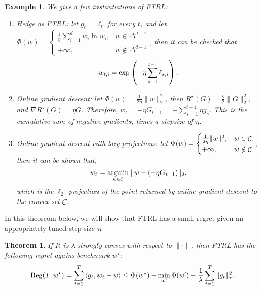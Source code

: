 \documentclass{article}
\newtheorem{example}{Example}
\newtheorem{theorem}{Theorem}
\DeclareMathOperator*{\Reg}{{\rm Reg}}
\DeclareMathOperator*{\Ccal}{{\cal C}}
\DeclareMathOperator*{\argmin}{{\rm argmin}}
\newcommand{\inner}[2]{\left\langle #1,#2 \right\rangle}
\begin{document}
\begin{example}
We give a few instantiations of FTRL:
\begin{enumerate}
\item Hedge as FTRL: let $g_t = \ell_t$ for every $t$, and let $\Phi(w) = \begin{cases} \frac1\eta \sum_{i=1}^d w_i \ln w_i, & w \in \Delta^{d-1} \\
 +\infty, & w \notin \Delta^{d-1} \end{cases}$, then it can be checked that
 \[ w_{t,i} = \exp\del{-\eta \sum_{s=1}^{t-1} \ell_{s,i}}. \]

\item Online gradient descent: let $\Phi(w) = \frac{1}{2\eta}\| w \|_2^2$, then $R^\star(G) = \frac{\eta}{2} \| G \|_2^2$, and $\nabla R^\star(G) = \eta G$.
Therefore, $w_t = -\eta G_{t-1} = - \sum_{s=1}^{t-1} \eta g_s$. This is the cumulative sum of negative gradients, times a stepsize of $\eta$.

\item Online gradient descent with lazy projections: let $\Phi(w) = \begin{cases} \frac{1}{2\eta}\| w \|^2,& w \in \Ccal, \\ +\infty, & w \notin \Ccal \end{cases}$, then it can be shown that,
\[ w_t = \argmin_{w \in \Ccal} \| w - (-\eta G_{t-1}) \|_2, \]
which is the $\ell_2$-projection of the point returned by online gradient descent to the convex set $\Ccal$.
\end{enumerate}
\end{example}

In this theoreom below, we will show that FTRL has a small regret given an appropriately-tuned step size $\eta$.

\begin{theorem}
If $R$ is $\lambda$-strongly convex with respect to $\| \cdot \|$, then FTRL has the following regret agains benchmark $w^\star$:
\[ \Reg(T, w^\star) = \sum_{t=1}^T \inner{g_t}{w_t - w} \leq \Phi(w^\star) - \min_{w'} \Phi(w') + \frac1 \lambda \sum_{t=1}^T \| g_t \|_\star^2. \]
\label{thm:ftrl}
\end{theorem}
\end{document}
